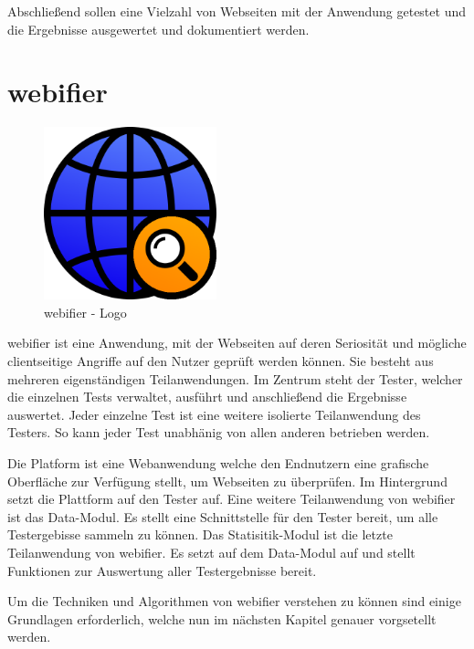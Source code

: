 Abschließend sollen eine Vielzahl von Webseiten mit der Anwendung getestet und die Ergebnisse ausgewertet und dokumentiert werden.

\section{webifier}

\begin{figure}[H]
  \centering
  \includegraphics[width=5cm]{images/webifier}
  \caption{webifier - Logo}
  \label{fig:webifier-logo}
\end{figure}

webifier ist eine Anwendung, mit der Webseiten auf deren Seriosität und mögliche clientseitige Angriffe auf den Nutzer geprüft werden können. Sie besteht aus mehreren eigenständigen Teilanwendungen. Im Zentrum steht der Tester, welcher die einzelnen Tests verwaltet, ausführt und anschließend die Ergebnisse auswertet. Jeder einzelne Test ist eine weitere isolierte Teilanwendung des Testers. So kann jeder Test unabhänig von allen anderen betrieben werden.

Die Platform ist eine Webanwendung welche den Endnutzern eine grafische Oberfläche zur Verfügung stellt, um Webseiten zu überprüfen. Im Hintergrund setzt die Plattform auf den Tester auf. Eine weitere Teilanwendung von webifier ist das Data-Modul. Es stellt eine Schnittstelle für den Tester bereit, um alle Testergebisse sammeln zu können. Das Statisitik-Modul ist die letzte Teilanwendung von webifier. Es setzt auf dem Data-Modul auf und stellt Funktionen zur Auswertung aller Testergebnisse bereit.

Um die Techniken und Algorithmen von webifier verstehen zu können sind einige Grundlagen erforderlich, welche nun im nächsten Kapitel genauer vorgsetellt werden.
